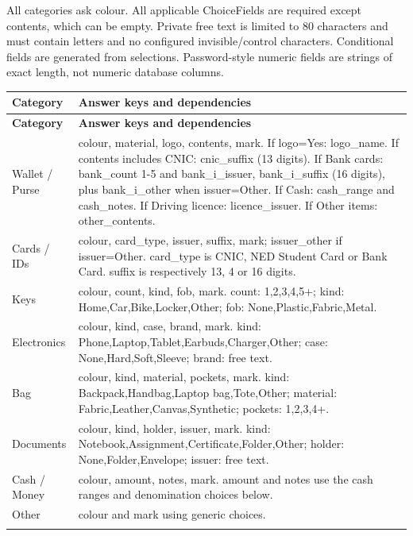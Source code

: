 \documentclass[12pt,a4paper,oneside]{report}
\begin{document}
All categories ask colour. All applicable ChoiceFields are required except contents, which can be empty. Private free text is limited to 80 characters and must contain letters and no configured invisible/control characters. Conditional fields are generated from selections. Password-style numeric fields are strings of exact length, not numeric database columns.

\begin{longtable}{@{}P{0.23\dimexpr\textwidth-12pt\relax}P{0.77\dimexpr\textwidth-12pt\relax}@{}}

\toprule \textbf{Category} & \textbf{Answer keys and dependencies} \\ \midrule\endfirsthead

\toprule \textbf{Category} & \textbf{Answer keys and dependencies} \\ \midrule\endhead

\bottomrule\endfoot

Wallet / Purse & colour, material, logo, contents, mark. If logo=Yes: logo\_name. If contents includes CNIC: cnic\_suffix (13 digits). If Bank cards: bank\_count 1-5 and bank\_i\_issuer, bank\_i\_suffix (16 digits), plus bank\_i\_other when issuer=Other. If Cash: cash\_range and cash\_notes. If Driving licence: licence\_issuer. If Other items: other\_contents. \\ \addlinespace[3pt]

Cards / IDs & colour, card\_type, issuer, suffix, mark; issuer\_other if issuer=Other. card\_type is CNIC, NED Student Card or Bank Card. suffix is respectively 13, 4 or 16 digits. \\ \addlinespace[3pt]

Keys & colour, count, kind, fob, mark. count: 1,2,3,4,5+; kind: Home,Car,Bike,Locker,Other; fob: None,Plastic,Fabric,Metal. \\ \addlinespace[3pt]

Electronics & colour, kind, case, brand, mark. kind: Phone,Laptop,Tablet,Earbuds,Charger,Other; case: None,Hard,Soft,Sleeve; brand: free text. \\ \addlinespace[3pt]

Bag & colour, kind, material, pockets, mark. kind: Backpack,Handbag,Laptop bag,Tote,Other; material: Fabric,Leather,Canvas,Synthetic; pockets: 1,2,3,4+. \\ \addlinespace[3pt]

Documents & colour, kind, holder, issuer, mark. kind: Notebook,Assignment,Certificate,Folder,Other; holder: None,Folder,Envelope; issuer: free text. \\ \addlinespace[3pt]

Cash / Money & colour, amount, notes, mark. amount and notes use the cash ranges and denomination choices below. \\ \addlinespace[3pt]

Other & colour and mark using generic choices. \\ \addlinespace[3pt]

\end{longtable}
\end{document}
